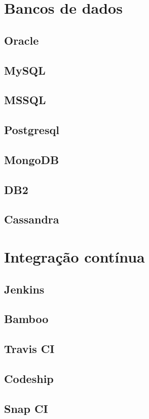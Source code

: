 

    \section{Bancos de dados}

	\subsection{Oracle}
	\subsection{MySQL}
	\subsection{MSSQL}
	\subsection{Postgresql}
	\subsection{MongoDB}
	\subsection{DB2}
	\subsection{Cassandra}

    \section{Integração contínua}

	\subsection{Jenkins}
	\subsection{Bamboo}
	\subsection{Travis CI}
	\subsection{Codeship}
	\subsection{Snap CI}
